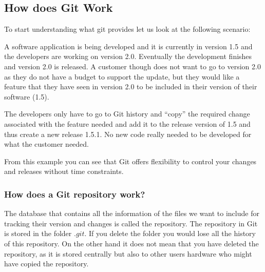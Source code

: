 \documentclass[
]{book}
\begin{document}
\hypertarget{how-does-git-work}{%
\subsection*{How does Git Work}\label{how-does-git-work}}

To start understanding what git provides let us look at the following scenario:

A software application is being developed and it is currently in version 1.5 and the developers are working on version 2.0.
Eventually the development finishes and version 2.0 is released. A customer though does not want to go to version 2.0 as they do not have a budget to support the update, but they would like a feature that they have seen in version 2.0 to be included in their version of their software (1.5).

The developers only have to go to Git history and ``copy'' the required change associated with the feature needed and add it to the release version of 1.5 and thus create a new release 1.5.1.
No new code really needed to be developed for what the customer needed.

From this example you can see that Git offers flexibility to control your changes and releases without time constraints.

\hypertarget{how-does-a-git-repository-work}{%
\subsubsection*{How does a Git repository work?}\label{how-does-a-git-repository-work}}

The database that contains all the information of the files we want to include for tracking their version and changes is called the repository. The repository in Git is stored in the folder \(.git\). If you delete the folder you would lose all the history of this repository. On the other hand it does not mean that you have deleted the repository, as it is stored centrally but also to other users hardware who might have copied the repository.
\end{document}
